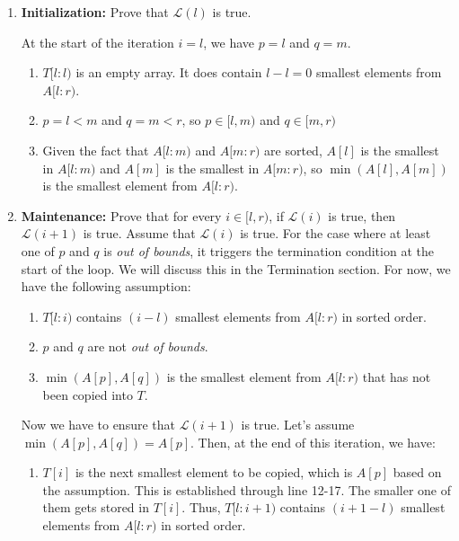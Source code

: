 \documentclass[12pt]{article}
\begin{document}
\begin{enumerate}
    \item \textbf{Initialization:} Prove that \(\mathcal{L}(l)\) is true.

    At the start of the iteration \(i = l\), we have \(p = l\) and \(q = m\).
    \begin{enumerate}
        \item \(T[l : l)\) is an empty array. It does contain \(l - l = 0\) smallest elements from \(A[l : r)\).
        \item \(p = l < m\) and \(q = m < r\), so \(p \in [l, m)\) and \(q \in [m, r)\)
        \item Given the fact that \(A[l : m)\) and \(A[m : r)\) are sorted, \(A[l]\) is the smallest in \(A[l : m)\) and \(A[m]\) is the smallest in \(A[m : r)\), so \(\min(A[l], A[m])\) is the smallest element from \(A[l : r)\).
    \end{enumerate}

    \item \textbf{Maintenance:} Prove that for every \(i \in [l, r)\), if \(\mathcal{L}(i)\) is true, then \(\mathcal{L}(i+1)\) is true.
    Assume that \(\mathcal{L}(i)\) is true. For the case where at least one of \(p\) and \(q\) is \textit{out of bounds}, it triggers the termination condition at the start of the loop. We will discuss this in the Termination section. For now, we have the following assumption:
    \begin{enumerate}
        \item \(T[l : i)\) contains \((i - l)\) smallest elements from \(A[l : r)\) in sorted order.
        \item \(p\) and \(q\) are not \textit{out of bounds}.
        \item \(\min(A[p], A[q])\) is the smallest element from \(A[l : r)\) that has not been copied into \(T\).
    \end{enumerate}

    Now we have to ensure that \(\mathcal{L}(i+1)\) is true. Let's assume \(\min(A[p], A[q]) = A[p]\). Then, at the end of this iteration, we have:

    \begin{enumerate}
        \item \(T[i]\) is the next smallest element to be copied, which is \(A[p]\) based on the assumption. This is established through line 12-17. The smaller one of them gets stored in \(T[i]\). Thus, \(T[l : i+1)\) contains \((i + 1 - l)\) smallest elements from \(A[l : r)\) in sorted order.


\end{enumerate}
\end{enumerate}
\end{document}

